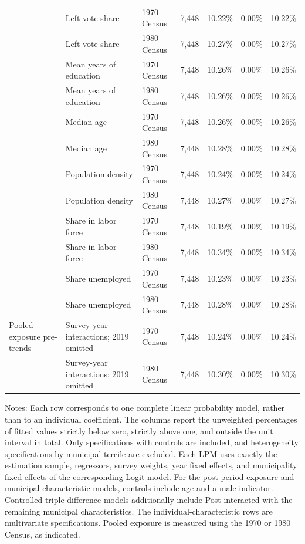 \begin{longtable}{p{}p{}p{}rrrr}
 & Left vote share & 1970 Census &        7,448 & 10.22\% &  0.00\% & 10.22\% \\
 & Left vote share & 1980 Census &        7,448 & 10.27\% &  0.00\% & 10.27\% \\
 & Mean years of education & 1970 Census &        7,448 & 10.26\% &  0.00\% & 10.26\% \\
 & Mean years of education & 1980 Census &        7,448 & 10.26\% &  0.00\% & 10.26\% \\
 & Median age & 1970 Census &        7,448 & 10.26\% &  0.00\% & 10.26\% \\
 & Median age & 1980 Census &        7,448 & 10.28\% &  0.00\% & 10.28\% \\
 & Population density & 1970 Census &        7,448 & 10.24\% &  0.00\% & 10.24\% \\
 & Population density & 1980 Census &        7,448 & 10.27\% &  0.00\% & 10.27\% \\
 & Share in labor force & 1970 Census &        7,448 & 10.19\% &  0.00\% & 10.19\% \\
 & Share in labor force & 1980 Census &        7,448 & 10.34\% &  0.00\% & 10.34\% \\
 & Share unemployed & 1970 Census &        7,448 & 10.23\% &  0.00\% & 10.23\% \\
 & Share unemployed & 1980 Census &        7,448 & 10.28\% &  0.00\% & 10.28\% \\
\addlinespace
Pooled-exposure pre-trends & Survey-year interactions; 2019 omitted & 1970 Census &        7,448 & 10.24\% &  0.00\% & 10.24\% \\
 & Survey-year interactions; 2019 omitted & 1980 Census &        7,448 & 10.30\% &  0.00\% & 10.30\% \\
\hline
\end{longtable}
\begin{minipage}{0.98\textwidth}
\footnotesize Notes: Each row corresponds to one complete linear probability model, rather than to an individual coefficient. The columns report the unweighted percentages of fitted values strictly below zero, strictly above one, and outside the unit interval in total. Only specifications with controls are included, and heterogeneity specifications by municipal tercile are excluded. Each LPM uses exactly the estimation sample, regressors, survey weights, year fixed effects, and municipality fixed effects of the corresponding Logit model. For the post-period exposure and municipal-characteristic models, controls include age and a male indicator. Controlled triple-difference models additionally include Post interacted with the remaining municipal characteristics. The individual-characteristic rows are multivariate specifications. Pooled exposure is measured using the 1970 or 1980 Census, as indicated.
\end{minipage}
